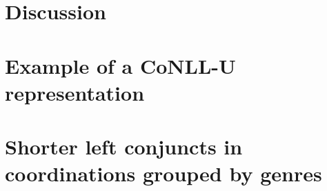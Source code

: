 \documentclass[12pt]{report}
\begin{document}
\chapter{Discussion}\label{ch:discussion}
    

\appendix
\captionsetup{labelfont=bf}
\chapter{Example of a CoNLL-U representation}\label{ap:conllu}
\chapter{Shorter left conjuncts in coordinations grouped by genres}\label{ap:genres}
    


\end{document}
